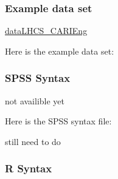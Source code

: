 \documentclass[
]{book}
\newenvironment{Shaded}{\begin{snugshade}}{\end{snugshade}}
\newcommand{\NormalTok}[1]{#1}
\begin{document}
\hypertarget{example-data-set-3}{%
\subsubsection{Example data set}\label{example-data-set-3}}

\href{https://github.com/WFP-VAM/RBD_FS_CH_guide_EN/blob/master/example_datasets/dataLHCS_CARIEng.sav}{dataLHCS\_CARIEng}

Here is the example data set:

\hypertarget{spss-syntax-3}{%
\subsubsection{SPSS Syntax}\label{spss-syntax-3}}

\begin{Shaded}
\begin{Highlighting}[]
\NormalTok{not availible yet}
\end{Highlighting}
\end{Shaded}

Here is the SPSS syntax file:

still need to do

\hypertarget{r-syntax-3}{%
\subsubsection{R Syntax}\label{r-syntax-3}}
\end{document}
